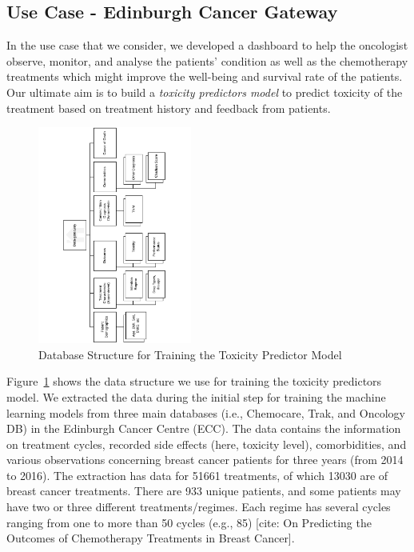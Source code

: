 \subsection{Use Case - Edinburgh Cancer Gateway}

\noindent
In the use case that we consider, we developed a dashboard to help the oncologist observe, monitor, and analyse the patients' condition as well as the chemotherapy treatments which might improve the well-being and survival rate of the patients. Our ultimate aim is to build a \emph{toxicity predictors model} to predict toxicity of the treatment based on treatment history and feedback from patients. 
\begin{figure}[t!]
    \centering
    \includegraphics[angle=-90,width=0.45\textwidth]{images/ECG.pdf}
    \caption{Database Structure for Training the Toxicity Predictor Model}
    \label{fig:ECG}
\end{figure}
Figure~\ref{fig:ECG} shows the data structure we use for training the toxicity predictors model. We extracted the data during the initial step for training the machine learning models from three main databases (i.e., Chemocare, Trak, and Oncology DB) in the Edinburgh Cancer Centre (ECC). The data contains the information on treatment cycles, recorded side effects (here, toxicity level), comorbidities, and various observations concerning breast cancer patients for three years (from 2014 to 2016). The extraction has data for 51661 treatments, of which 13030 are of breast cancer treatments. There are 933 unique patients, and some patients may have two or three different treatments/regimes. Each regime has several cycles ranging from one to more than 50 cycles (e.g., 85) [cite: On Predicting the Outcomes of Chemotherapy Treatments in Breast Cancer].

